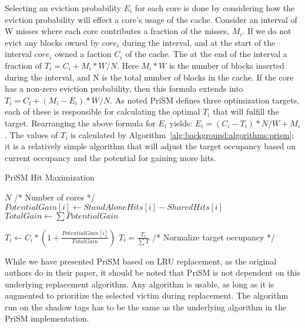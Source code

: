 Selecting an eviction probability $E_i$ for each core is done by considering how the eviction probability will effect a core's usage of the cache.
Consider an interval of W misses where each core contributes a fraction of the misses, $M_i$.
If we do not evict any blocks owned by $core_i$ during the interval, and at the start of the interval $core_i$ owned a faction $C_i$ of the cache.
The at the end of the interval a fraction of $T_i = C_i + M_i * W/N$. 
Here $M_i * W$ is the number of blocks inserted during the interval, and N is the total number of blocks in the cache.
If the core has a non-zero eviction probability, then this formula extends into $T_i = C_i + (M_i - E_i) * W/N$.
As noted PriSM defines three optimization targets, each of these is responsible for calculating the optimal $T_i$ that will fulfill the target.
Rearranging the above formula for $E_i$ yields: $E_i = (C_i - T_i) * N/W + M_i$.
The values of $T_i$ is calculated by Algorithm~\ref{alg:background:algorithms:prism}; it is a relatively simple algorithm that will adjust the target occupancy based on current occupancy and the potential for gaining more hits.

\begin{algorithm}[ht]
\caption{PriSM Hit Maximization}
\label{alg:background:algorithms:prism}
\begin{algorithmic}[1]
\State $N$ /* Number of cores */
	\State $PotentialGain[i]\gets StandAloneHits[i] - SharedHits[i]$
\EndFor
\State $TotalGain\gets \sum{PotentialGain}$

	\State $T_i\gets C_i * (1 + \frac{PotentialGain[i]}{TotalGain})$
\EndFor
\State $T_i = \frac{T_i}{\sum{T}}$ /* Normalize target occupancy */
\end{algorithmic}
\end{algorithm}

While we have presented PriSM based on LRU replacement, as the original authors do in their paper, it should be noted that PriSM is not dependent on this underlying replacement algorithm.
Any algorithm is usable, as long as it is augmented to prioritize the selected victim during replacement.
The algorithm run on the shadow tags has to be the same as the underlying algorithm in the PriSM implementation.

